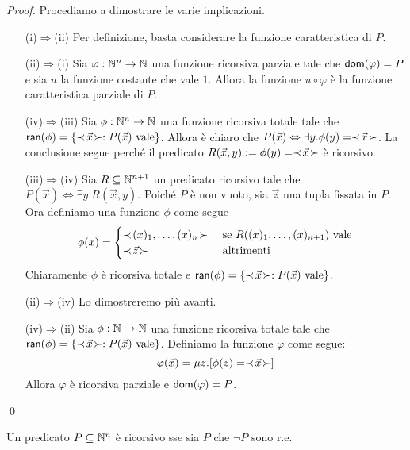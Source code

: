 \documentclass[runningheads,a4paper]{llncs}
\begin{document}
\begin{proof}
Procediamo a dimostrare le varie implicazioni.
\begin{itemize}
\item[(i)$\Rightarrow$(ii)] Per definizione, basta considerare la funzione caratteristica di $P$.
\item[(ii)$\Rightarrow$(i)] Sia $\varphi: \mathbb{N}^n \to \mathbb{N}$ una funzione ricorsiva parziale tale che $\mathsf{dom}(\varphi) = P$ e sia $u$ la funzione
 costante che vale $1$. Allora la funzione $u \circ \varphi$ \`{e} la funzione caratteristica parziale di $P$.
\item[(iv)$\Rightarrow$(iii)] Sia $\phi: \mathbb{N}^n \to \mathbb{N}$ una funzione ricorsiva totale tale che\\
 $\mathsf{ran}(\phi) = \{\prec\! \vec x \!\succ : P(\vec x) \mbox{ vale} \}$.
 Allora \`{e} chiaro che $P(\vec x) \Leftrightarrow \exists y.\phi(y) = \prec\! \vec x \!\succ$. La conclusione segue perch\'{e} il predicato
 $R(\vec x,y)\mathrel{:=} \phi(y) = \prec\! \vec x \!\succ$ \`{e} ricorsivo.
\item[(iii)$\Rightarrow$(iv)] Sia $R \subseteq \mathbb{N}^{n+1}$ un predicato ricorsivo tale che $P(\vec x) \Leftrightarrow \exists y.R(\vec x,y)$.
 Poich\'{e} $P$ \`{e} non vuoto, sia $\vec z$ una tupla fissata in $P$. Ora definiamo una funzione $\phi$ come segue
$$
\phi(x) = 
\begin{cases}
\prec\! (x)_{1},\ldots,(x)_{n} \!\succ & \mbox{ se $R((x)_{1},\ldots,(x)_{n+1})$ vale} \\
\prec\! \vec z \!\succ & \mbox{ altrimenti } \\
\end{cases}
$$
Chiaramente $\phi$ \`{e} ricorsiva totale e $\mathsf{ran}(\phi) = \{\prec\! \vec x \!\succ : P(\vec x) \mbox{ vale} \}$.

\item[(ii)$\Rightarrow$(iv)] Lo dimostreremo pi\`{u} avanti.

\item[(iv)$\Rightarrow$(ii)] Sia $\phi: \mathbb{N} \to \mathbb{N}$ una funzione ricorsiva totale tale che
 $\mathsf{ran}(\phi) = \{\prec\! \vec x \!\succ : P(\vec x) \mbox{ vale} \}$. Definiamo la funzione $\varphi$ come segue:
$$ \varphi(\vec x) = \mu z.[\phi(z) = \prec\! \vec x \!\succ]$$
Allora $\varphi$ \`{e} ricorsiva parziale e $\mathsf{dom}(\varphi) = P$.
\end{itemize} 
\qed\end{proof}

\begin{theorem}
Un predicato $P \subseteq \mathbb{N}^n$ \`{e} ricorsivo sse sia $P$ che $\neg P$ sono r.e.
\end{theorem}
\end{document}
